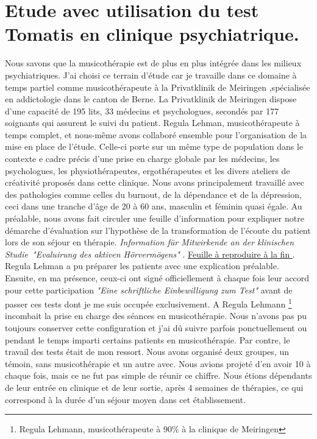 \chapter{Etude avec utilisation du test Tomatis en clinique psychiatrique.}
Nous savons que la musicothérapie est de plus en plus intégrée dans
les milieux psychiatriques. J'ai choisi ce terrain d'étude car 
je travaille dans ce domaine  à temps partiel comme musicothérapeute à la Privatklinik
de Meiringen ,spécialisée en
addictologie dans le canton de Berne. La Privatklinik
de Meiringen dispose d'une capacité de 195 lits, 33 médecins et
psychologues, secondés par 177 soignants qui assurent le suivi du
patient. Regula Lehman, musicothérapeute à temps complet, et nous-même avons
collaboré ensemble pour l'organisation de la mise en place de l'étude. Celle-ci porte sur un même type de
population dans le contexte e cadre  précis d'une prise en charge globale
par les médecins, les psychologues, les physiothérapeutes,
ergothérapeutes et les divers ateliers de créativité proposés dans
cette clinique. Nous avons principalement travaillé avec des
pathologies comme celles du burnout, de la dépendance et de la
dépression, ceci dans une tranche d'âge de 20 à 60 ans, masculin et
féminin quasi égale. Au préalable, nous avons fait circuler une
feuille d'information pour expliquer notre démarche d'évaluation sur
l'hypothèse de la transformation de l'écoute du patient lors de son
séjour en thérapie. \emph{Information für Mitwirkende an der klinischen
Studie\  "Evaluirung des aktiven Hörvermögens" }. \underline{Feuille à reproduire à la fin }. Regula Lehman a pu
préparer  les patients avec une explication préalable. Ensuite,
en ma présence, ceux-ci ont signé officiellement à chaque fois leur
accord pour cette participation  \emph{"Eine schriftliche Einbewilligung zum
Test"} avant de passer ces tests dont je me suis occupée exclusivement.
A Regula Lehmann  \footnote{Regula
  Lehmann, musicothérapeute  à 90\%  à la clinique de Meiringen} incombait la
prise en charge des séances en musicothérapie. Nous n'avons pas pu
toujours conserver cette configuration et j'ai dû suivre parfois
ponctuellement ou pendant le temps imparti certains patients en
musicothérapie. Par contre, le travail des tests était de mon ressort.  Nous avons organisé deux groupes, un témoin, sans
musicothérapie et un autre avec. Nous avions projeté d'en avoir
10 à chaque fois, mais ce ne fut pas simple de réunir ce
chiffre. Nous étions dépendants de leur entrée en clinique et de leur
sortie, après 4 semaines de thérapies, ce qui correspond à la durée
d'un séjour moyen dans cet établissement.


